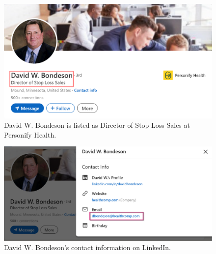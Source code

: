 \begin{fullwidth}
    \begin{figure}[H] %
        \label{sec:Fig4}
        \centering
        \includegraphics[width=.9\linewidth]{assets/BondesonLinkedinHeader.png}
        \captionsetup{justification=centering}
        \caption{David W. Bondeson is listed as Director of Stop Loss Sales at Personify Health.}
    \end{figure}

    \begin{figure}[H] %
        \label{sec:Fig5}
        \centering
        \includegraphics[width=.9\linewidth]{assets/bondeson-email.png}
        \captionsetup{justification=centering}
        \caption{David W. Bondeson's contact information on LinkedIn.}
    \end{figure}


\end{fullwidth}
